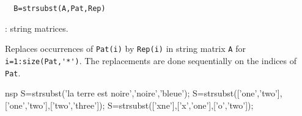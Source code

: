 
\begin{mandesc}
\end{mandesc}
\begin{calling_sequence}
\begin{verbatim}
  B=strsubst(A,Pat,Rep)
\end{verbatim}
\end{calling_sequence}

\begin{parameters}
  \begin{varlist}
    : string matrices.
  \end{varlist}
\end{parameters}

\begin{mandescription}
  Replaces occurrences of \verb+Pat(i)+ by \verb+Rep(i)+ in string matrix \verb+A+ for \verb+i=1:size(Pat,'*')+. 
  The replacements are done sequentially on the indices of \verb+Pat+.
\end{mandescription}

\begin{examples}
  \begin{mintednsp}{nsp}
    S=strsubst('la terre est noire','noire','bleue');
    S=strsubst(['one','two'],['one','two'],['two','three']); 
    S=strsubst(['xne'],['x','one'],['o','two']);
  \end{mintednsp}
\end{examples}

\begin{manseealso}
\end{manseealso}
